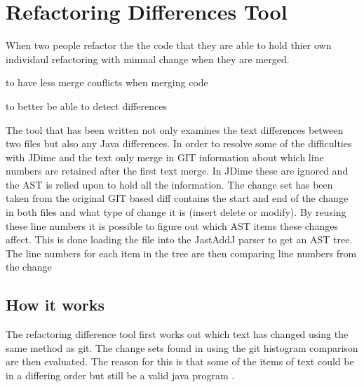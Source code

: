 

\chapter{Refactoring Differences Tool}


When two people refactor the the code that they are able to hold thier own individaul refactoring with minmal change when they are merged.


to have less merge conflicts when merging code 

to better be able to detect differences

The tool that has been written not only examines the text differences between two files but also any Java differences. In order to resolve some of the difficulties with JDime and  the text only merge in GIT information about which line numbers are retained after the first text merge.  In JDime these are ignored and the AST is relied upon to hold all the information.  The change set has been taken from the original GIT based diff contains the start and end of the change in both files and what type of change it is (insert delete or modify).  By reusing these line numbers it is possible to figure out which AST items these changes affect. This is done loading the file into the JastAddJ parser to get an AST tree. The line numbers for each item in the tree are then comparing line numbers from the change

\section{How it works}

The refactoring difference tool first works out which text has changed using the same method as git.
The change sets found in using the git histogram comparison are then evaluated.
The reason for this is that some of the items of text could be in a differing order but still be a valid java program
.

 



 







